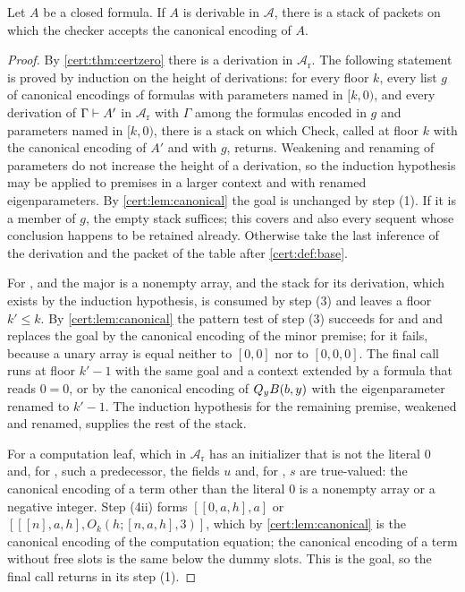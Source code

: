 \begin{theorem}\label{cert:thm:base-complete}
Let $A$ be a closed formula. If $A$ is derivable in $\mathcal A$, there is a
stack of packets on which the checker accepts the canonical encoding of $A$.
\end{theorem}
\begin{proof}
By \cref{cert:thm:certzero} there is a derivation in $\mathcal A_{\mathrm r}$.
The following statement is proved by induction on the height of derivations:
for every floor $k$, every list $g$ of canonical encodings of formulas with
parameters named in $[k,0)$, and every derivation of $\Gamma\vdash A'$ in
$\mathcal A_{\mathrm r}$ with $\Gamma$ among the formulas encoded in $g$ and
parameters named in $[k,0)$, there is a stack on which $\mathrm{Check}$, called
at floor $k$ with the canonical encoding of $A'$ and with $g$, returns.
Weakening and renaming of parameters do not increase the height of a
derivation, so the induction hypothesis may be applied to premises in a larger
context and with renamed eigenparameters. By \cref{cert:lem:canonical} the
goal is unchanged by step (1). If it is a member of $g$, the empty stack
suffices; this covers  and also every sequent whose conclusion
happens to be retained already. Otherwise take the last inference of the
derivation and the packet of the table after \cref{cert:def:base}.

For ,  and  the major is a nonempty
array, and the stack for its derivation, which exists by the induction
hypothesis, is consumed by step (3) and leaves a floor $k'\le k$. By
\cref{cert:lem:canonical} the pattern test of step (3) succeeds for
 and  and replaces the goal by the canonical
encoding of the minor premise; for  it fails, because a unary
array is equal neither to $[0,0]$ nor to $[0,0,0]$. The final call runs at
floor $k'-1$ with the same goal and a context extended by a formula that
reads $0=0$, or by the canonical encoding of $Q_{y}B(b,y)$ with the
eigenparameter renamed to $k'-1$. The induction hypothesis for the remaining
premise, weakened and renamed, supplies the rest of the stack.

For a computation leaf, which in $\mathcal A_{\mathrm r}$ has an initializer
that is not the literal $0$ and, for , such a predecessor, the
fields $u$ and, for , $s$ are true-valued: the canonical encoding
of a term other than the literal $0$ is a nonempty array or a negative
integer. Step (4ii) forms $[[0,a,h],a]$ or
$[[[n],a,h],O_k(h;[n,a,h],3)]$, which by \cref{cert:lem:canonical} is the
canonical encoding of the computation equation; the canonical encoding of a
term without free slots is the same below the dummy slots. This is the goal,
so the final call returns in its step (1).


\end{proof}
